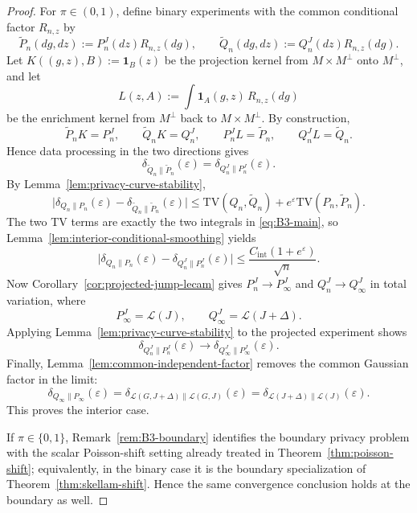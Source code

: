 \documentclass{article}
\begin{document}
\begin{proof}
For $\pi\in(0,1)$, define binary experiments with the common conditional factor $R_{n,z}$ by
\[
\widetilde P_n(dg,dz):=P_n^J(dz)R_{n,z}(dg),
\qquad
\widetilde Q_n(dg,dz):=Q_n^J(dz)R_{n,z}(dg).
\]
Let $K((g,z),B):=\mathbf 1_B(z)$ be the projection kernel from $M\times M^\perp$ onto $M^\perp$, and let
\[
L(z,A):=\int \mathbf 1_A(g,z)\,R_{n,z}(dg)
\]
be the enrichment kernel from $M^\perp$ back to $M\times M^\perp$. By construction,
\[
\widetilde P_n K=P_n^J,\qquad \widetilde Q_n K=Q_n^J,\qquad P_n^J L=\widetilde P_n,\qquad Q_n^J L=\widetilde Q_n.
\]
Hence data processing in the two directions gives
\[
\delta_{\widetilde Q_n\|\widetilde P_n}(\varepsilon)=\delta_{Q_n^J\|P_n^J}(\varepsilon).
\]
By Lemma~\ref{lem:privacy-curve-stability},
\[
\bigl|\delta_{Q_n\|P_n}(\varepsilon)-\delta_{\widetilde Q_n\|\widetilde P_n}(\varepsilon)\bigr|
\le \mathrm{TV}(Q_n,\widetilde Q_n)+e^\varepsilon\mathrm{TV}(P_n,\widetilde P_n).
\]
The two TV terms are exactly the two integrals in \eqref{eq:B3-main}, so Lemma~\ref{lem:interior-conditional-smoothing} yields
\[
\bigl|\delta_{Q_n\|P_n}(\varepsilon)-\delta_{Q_n^J\|P_n^J}(\varepsilon)\bigr|
\le \frac{C_{\mathrm{int}}(1+e^\varepsilon)}{\sqrt n}.
\]
Now Corollary~\ref{cor:projected-jump-lecam} gives $P_n^J\to P_\infty^J$ and $Q_n^J\to Q_\infty^J$ in total variation, where
\[
P_\infty^J=\mathcal L(J),
\qquad
Q_\infty^J=\mathcal L(J+\Delta).
\]
Applying Lemma~\ref{lem:privacy-curve-stability} to the projected experiment shows
\[
\delta_{Q_n^J\|P_n^J}(\varepsilon)\to \delta_{Q_\infty^J\|P_\infty^J}(\varepsilon).
\]
Finally, Lemma~\ref{lem:common-independent-factor} removes the common Gaussian factor in the limit:
\[
\delta_{Q_\infty\|P_\infty}(\varepsilon)=\delta_{\mathcal L(G,J+\Delta)\|\mathcal L(G,J)}(\varepsilon)
=\delta_{\mathcal L(J+\Delta)\|\mathcal L(J)}(\varepsilon).
\]
This proves the interior case.

If $\pi\in\{0,1\}$, Remark~\ref{rem:B3-boundary} identifies the boundary privacy problem with the scalar Poisson-shift setting already treated in Theorem~\ref{thm:poisson-shift}; equivalently, in the binary case it is the boundary specialization of Theorem~\ref{thm:skellam-shift}. Hence the same convergence conclusion holds at the boundary as well.
\end{proof}
\end{document}
